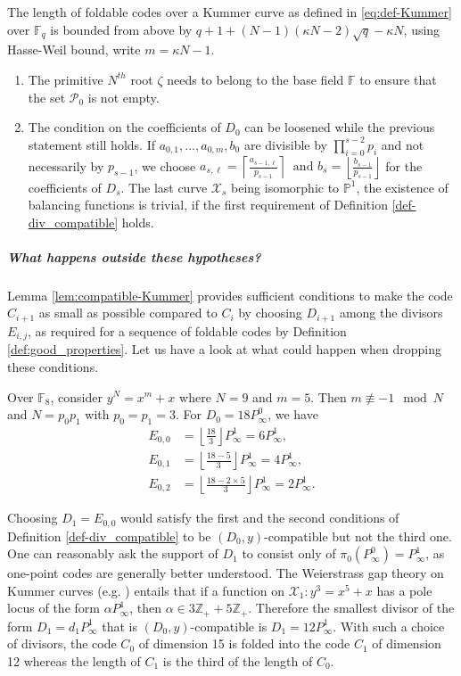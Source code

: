 \documentclass[10pt,a4paper]{article}
\newcommand\F{\mathbb{F}}
\newcommand\PP{\mathbb{P}}
\newcommand\Z{\mathbb{Z}}
\newcommand\floor[1]{\left\lfloor #1 \right\rfloor}
\newcommand\ceil[1]{\left\lceil #1 \right\rceil}
\newcommand\calX{\mathcal{X}}
\newcommand\calP{\mathcal{P}}
\theoremstyle{plain}
\theoremstyle{plain}
\theoremstyle{definition}
\theoremstyle{remark}
\theoremstyle{plain}
\begin{document}
The length of foldable codes over a Kummer curve as defined in \eqref{eq:def-Kummer} over $\F_q$ is bounded from above by $q+1+(N-1)(\kappa N-2)\sqrt{q}-\kappa N$, using Hasse-Weil bound, write $m=\kappa N-1$.

\begin{remark}
	\begin{enumerate}
		\item The primitive $N^{th}$ root $\zeta$ needs to belong to the base field $\F$ to ensure that the set $\calP_0$ is not empty.
		\item The condition on the coefficients of $D_0$ can be loosened while the previous statement still holds. If  $a_{0,1},\dots,a_{0,m},b_{0}$ are divisible by $\prod_{i=0}^{s-2} p_i$ and not necessarily by $p_{s-1}$, we choose $a_{s,\ell}=\ceil{\frac{a_{s-1,\ell}}{p_{s-1}}}\ \text{ and } b_{s}=\floor{\frac{b_{s-1}}{p_{s-1}}}$ for the coefficients of $D_s$. The last curve $\calX_s$ being isomorphic to $\PP^1$, the existence of balancing functions is trivial, if the first requirement of Definition \ref{def-div_compatible} holds.
	\end{enumerate} 
\end{remark}



\subparagraph*{What happens outside these hypotheses?}
Lemma \ref{lem:compatible-Kummer} provides sufficient conditions to make the code $C_{i+1}$ as small as possible compared to $C_i$ by choosing $D_{i+1}$ among the divisors $E_{i,j}$, as required for a sequence of foldable codes by Definition \ref{def:good_properties}. Let us have a look at what could happen when dropping these conditions.

\begin{example}\label{ex:bad_kummer}
	Over $\F_8$, consider $y^N=x^m+x$ where $N=9$ and $m=5$. Then $m \not\equiv -1 \mod N$ and $N=p_0p_1$ with $p_0=p_1=3$. For $D_0=18 P_\infty^0$, we have
	\begin{align*}
	E_{0,0}&=\floor{\frac{18}{3}}P_\infty^1=6 P_\infty^1, \\
	E_{0,1}&=\floor{\frac{18-5}{3}} P_\infty^1=4 P_\infty^1, \\ 
	E_{0,2}&=\floor{\frac{18-2 \times 5}{3}} P_\infty^1=2 P_\infty^1.
    \end{align*}
	
	Choosing $D_1=E_{0,0}$ would satisfy the first and the second conditions of Definition \ref{def-div_compatible} to be $(D_0,y)$-compatible but not the third one. One can reasonably ask the support of $D_1$ to consist only of $\pi_0(P_\infty^0)=P_\infty^1$, as one-point codes are generally better understood. The Weierstrass gap theory on Kummer curves (e.g. \cite[Theorem~3.2]{MQS15}) entails that if a function on $\calX_1 : y^3=x^5+x$ has a pole locus of the form $\alpha P_\infty^1$, then $\alpha \in 3\Z_++5\Z_+$. Therefore the smallest divisor of the form $D_1=d_1P_\infty^1$ that is $(D_0,y)$-compatible is $D_1=12 P_\infty^1$. With such a choice of divisors, the code $C_0$ of dimension 15 is folded into the code $C_1$ of dimension 12 whereas the length of $C_1$ is the third of the length of $C_0$.
	
\end{example}
\end{document}
